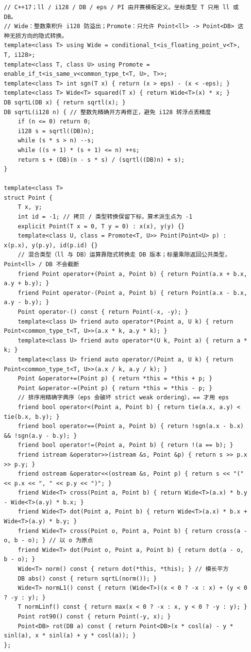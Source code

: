 \begin{verbatim}
// C++17；ll / i128 / DB / eps / PI 由开赛模板定义。坐标类型 T 只用 ll 或 DB。
// Wide：整数乘积升 i128 防溢出；Promote：只允许 Point<ll> -> Point<DB> 这种无损方向的隐式转换。
template<class T> using Wide = conditional_t<is_floating_point_v<T>, T, i128>;
template<class T, class U> using Promote = enable_if_t<is_same_v<common_type_t<T, U>, T>>;
template<class T> int sgn(T x) { return (x > eps) - (x < -eps); }
template<class T> Wide<T> squared(T x) { return Wide<T>(x) * x; }
DB sqrtL(DB x) { return sqrtl(x); }
DB sqrtL(i128 n) { // 整数先精确开方再修正，避免 i128 转浮点丢精度
	if (n <= 0) return 0;
	i128 s = sqrtl((DB)n);
	while (s * s > n) --s;
	while ((s + 1) * (s + 1) <= n) ++s;
	return s + (DB)(n - s * s) / (sqrtl((DB)n) + s);
}

template<class T>
struct Point {
	T x, y;
	int id = -1; // 拷贝 / 类型转换保留下标，算术派生点为 -1
	explicit Point(T x = 0, T y = 0) : x(x), y(y) {}
	template<class U, class = Promote<T, U>> Point(Point<U> p) : x(p.x), y(p.y), id(p.id) {}
	// 混合类型（ll 与 DB）运算靠隐式转换走 DB 版本；标量乘除返回公共类型，Point<ll> / DB 不会截断
	friend Point operator+(Point a, Point b) { return Point(a.x + b.x, a.y + b.y); }
	friend Point operator-(Point a, Point b) { return Point(a.x - b.x, a.y - b.y); }
	Point operator-() const { return Point(-x, -y); }
	template<class U> friend auto operator*(Point a, U k) { return Point<common_type_t<T, U>>(a.x * k, a.y * k); }
	template<class U> friend auto operator*(U k, Point a) { return a * k; }
	template<class U> friend auto operator/(Point a, U k) { return Point<common_type_t<T, U>>(a.x / k, a.y / k); }
	Point &operator+=(Point p) { return *this = *this + p; }
	Point &operator-=(Point p) { return *this = *this - p; }
	// 排序用精确字典序（eps 会破坏 strict weak ordering），== 才用 eps
	friend bool operator<(Point a, Point b) { return tie(a.x, a.y) < tie(b.x, b.y); }
	friend bool operator==(Point a, Point b) { return !sgn(a.x - b.x) && !sgn(a.y - b.y); }
	friend bool operator!=(Point a, Point b) { return !(a == b); }
	friend istream &operator>>(istream &s, Point &p) { return s >> p.x >> p.y; }
	friend ostream &operator<<(ostream &s, Point p) { return s << "(" << p.x << ", " << p.y << ")"; }
	friend Wide<T> cross(Point a, Point b) { return Wide<T>(a.x) * b.y - Wide<T>(a.y) * b.x; }
	friend Wide<T> dot(Point a, Point b) { return Wide<T>(a.x) * b.x + Wide<T>(a.y) * b.y; }
	friend Wide<T> cross(Point o, Point a, Point b) { return cross(a - o, b - o); } // 以 o 为原点
	friend Wide<T> dot(Point o, Point a, Point b) { return dot(a - o, b - o); }
	Wide<T> norm() const { return dot(*this, *this); } // 模长平方
	DB abs() const { return sqrtL(norm()); }
	Wide<T> normL1() const { return (Wide<T>)(x < 0 ? -x : x) + (y < 0 ? -y : y); }
	T normLinf() const { return max(x < 0 ? -x : x, y < 0 ? -y : y); }
	Point rot90() const { return Point(-y, x); }
	Point<DB> rot(DB a) const { return Point<DB>(x * cosl(a) - y * sinl(a), x * sinl(a) + y * cosl(a)); }
};


\end{verbatim}
